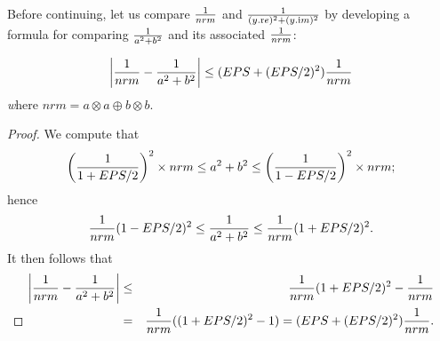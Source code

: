 Before continuing, let us compare ${1 \over nrm}$ and ${1 \over (y.{\mathrm re})^2 + (y.{\mathrm im})^2}$ by developing a formula for
comparing ${1 \over a^2 + b^2}$ and its associated ${1 \over nrm}$:
\begin{lemma}\label{GMT lemma7.2} $$\left|{1 \over nrm} - {1 \over a^2 + b^2}\right| \le   (EPS + (EPS/2)^2) {1 \over nrm}$$
{\textit where} $nrm = a\otimes a \oplus b \otimes b.$
\end{lemma}

\begin{proof}{}
We compute that 
$$\left({1 \over 1 + EPS/2}\right)^2 \times nrm
\le a^2 + b^2 
\le \left({1 \over 1 - EPS/2}\right)^2 \times nrm;$$ hence 
$${1 \over nrm} (1 - EPS/2)^2 
\le {1 \over a^2 + b^2}
\le {1 \over nrm} (1 + EPS/2)^2.$$  It then follows that 
\begin{eqnarray*}
\left|{1 \over nrm} - {1 \over a^2 + b^2}\right|& \le &
    {1 \over nrm} (1 + EPS/2)^2 - {1 \over nrm}\\
&=& {1 \over nrm} ((1 + EPS/2)^2 - 1) =
  (EPS + (EPS/2)^2){1 \over nrm} .\\
\noalign{\vskip-24pt}
\end{eqnarray*}
\end{proof}

